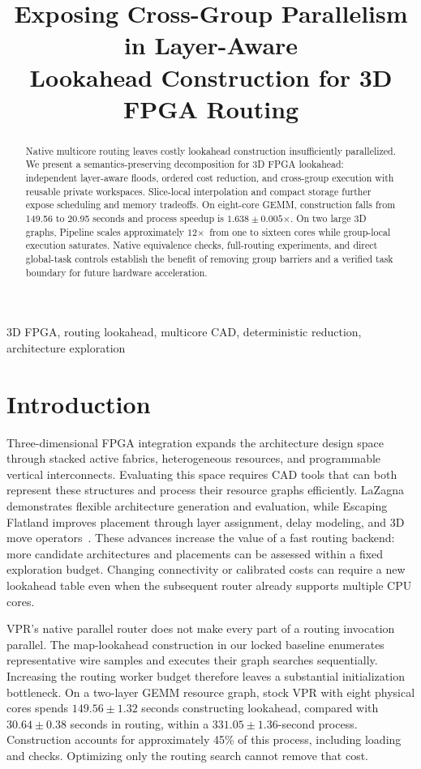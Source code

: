 \documentclass[conference,10pt,letterpaper]{IEEEtran}
\title{Exposing Cross-Group Parallelism in Layer-Aware\\Lookahead Construction for 3D FPGA Routing}
\author{\IEEEauthorblockN{Anonymous Authors}}
\newcommand{\speedup}{\ensuremath{\times}}
\begin{document}
\maketitle
\begin{abstract}
Native multicore routing leaves costly lookahead construction insufficiently parallelized. We present a semantics-preserving decomposition for 3D FPGA lookahead: independent layer-aware floods, ordered cost reduction, and cross-group execution with reusable private workspaces. Slice-local interpolation and compact storage further expose scheduling and memory tradeoffs. On eight-core GEMM, construction falls from 149.56 to 20.95 seconds and process speedup is $1.638\pm0.005$\speedup. On two large 3D graphs, Pipeline scales approximately $12$\speedup\ from one to sixteen cores while group-local execution saturates. Native equivalence checks, full-routing experiments, and direct global-task controls establish the benefit of removing group barriers and a verified task boundary for future hardware acceleration.
\end{abstract}
\begin{IEEEkeywords}
3D FPGA, routing lookahead, multicore CAD, deterministic reduction, architecture exploration
\end{IEEEkeywords}

\section{Introduction}
Three-dimensional FPGA integration expands the architecture design space through stacked active fabrics, heterogeneous resources, and programmable vertical interconnects. Evaluating this space requires CAD tools that can both represent these structures and process their resource graphs efficiently. LaZagna demonstrates flexible architecture generation and evaluation, while Escaping Flatland improves placement through layer assignment, delay modeling, and 3D move operators~\cite{lazagna,flatland}. These advances increase the value of a fast routing backend: more candidate architectures and placements can be assessed within a fixed exploration budget. Changing connectivity or calibrated costs can require a new lookahead table even when the subsequent router already supports multiple CPU cores.

VPR's native parallel router does not make every part of a routing invocation parallel. The map-lookahead construction in our locked baseline enumerates representative wire samples and executes their graph searches sequentially. Increasing the routing worker budget therefore leaves a substantial initialization bottleneck. On a two-layer GEMM resource graph, stock VPR with eight physical cores spends $149.56\pm1.32$ seconds constructing lookahead, compared with $30.64\pm0.38$ seconds in routing, within a $331.05\pm1.36$-second process. Construction accounts for approximately 45\% of this process, including loading and checks. Optimizing only the routing search cannot remove that cost.
\end{document}
